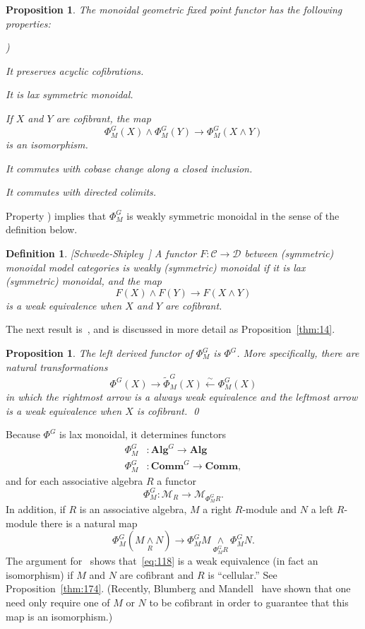 \documentclass{amsart}
\newtheorem{prop}[equation]{Proposition}
\newtheorem{definition}[equation]{Definition}
\newenvironment{defin}{\begin{definition}\rm}{\end{definition}}
\theoremstyle{definition}
\newtheorem{defin}[equation]{Definition}
\theoremstyle{remark}
\newcounter{thmItem}
\newcommand{\thmListItem}[1]{\rm \romannumeral#1)}
\newenvironment{thmList}{\begin{list}%
{\rm \roman{thmItem})}{\usecounter{thmItem}
\setlength{\labelwidth}{2em}
\setlength{\itemindent}{2em}
\setlength{\leftmargin}{0pt}
\setlength{\listparindent}{0pt}
\setlength{\parsep}{0pt}
\setlength{\partopsep}{0pt}
\setlength{\itemsep}{\medskipamount}
\setlength{\topsep}{\medskipamount}
}}{\end{list}}
\newcommand{\rmod}[1]{\mathcal M_{#1}}
\newcommand{\smashove}[1]{\underset{#1}{\wedge}}
\newcommand{\gfp}[1]{\Phi^{#1}}
\newcommand{\gfpm}[1]{\Phi_{M}^{#1}}
\newcommand{\phig}{\gfp{G}}
\newcommand{\phigm}{\gfpm{G}}
\newcommand{\einftycat}{\mathbf{Comm}}
\newcommand{\ainftycat}{\mathbf{Alg}}
\newcommand{\ugeinftycat}[1]{\einftycat^{#1}}
\newcommand{\ugainftycat}[1]{\ainftycat^{#1}}
\newcommand{\cat}[1]{{\mathcal #1}}
\begin{document}
\begin{prop}
\label{thm:203}
The monoidal geometric fixed point functor has the following
properties:
\begin{thmList}
\item It preserves acyclic cofibrations.
\item It is lax symmetric monoidal.
\item If $X$ and $Y$ are cofibrant, the map 
\[
\phigm(X)\wedge \phigm(Y)\to \phigm(X\wedge Y)
\]
is an isomorphism.
\item It commutes with cobase change along a closed inclusion.
\item It commutes with directed colimits.
\end{thmList}
\end{prop}

Property \thmListItem{3} implies that $\phigm$ is weakly symmetric monoidal in
the sense of the definition below.

\begin{defin}[Schwede-Shipley~\cite{MR1997322}]
\label{def:40} A functor $F:\cat C\to \cat D$ between (symmetric)
monoidal model categories is {\em weakly (symmetric) monoidal} if it
is lax (symmetric) monoidal, and the map
\[
F(X)\wedge F(Y)\to F(X\wedge Y)
\]
is a weak equivalence when $X$ and $Y$ are cofibrant.
\end{defin}

The next result is~\cite[Proposition V.4.17]{MR1922205}, and is
discussed in more detail as Proposition~\ref{thm:14}.

\begin{prop}
\label{thm:220} 
The left derived functor of $\phigm$ is $\phig$.  More
specifically, there are natural transformations
\[
\phig(X)\to \tilde{\Phi}^{G}_{M}(X)\xleftarrow{\sim} \phigm(X)
\]
in which the rightmost arrow is a always weak equivalence and the
leftmost arrow is a weak equivalence when $X$ is cofibrant.  \qed
\end{prop}

Because $\phig$ is lax monoidal, it determines functors
\begin{align*}
\phigm&:\ugainftycat{G}\to\ainftycat \\
\phigm&:\ugeinftycat{G}\to\einftycat,
\end{align*}
and for each associative algebra $R$ a functor 
\[
\phigm: \rmod{R}\to\rmod{\phigm R}.
\]
In addition, if $R$ is an associative algebra, $M$ a right $R$-module
and $N$ a left $R$-module there is a natural map
\begin{equation}
\label{eq:118}
\phigm(M\smashove{R}N) \to \phigm M\smashove{\phigm R} \phigm N.
\end{equation}
The argument for~\cite[Proposition V.4.7]{MR1922205} shows
that~\eqref{eq:118} is a weak equivalence (in fact an isomorphism) if
$M$ and $N$ are cofibrant and $R$ is ``cellular.'' See
Proposition~\ref{thm:174}.  (Recently, Blumberg and
Mandell~\cite[Appendix~A]{blumberg_cylcotomic} have shown that one
need only require one of $M$ or $N$ to be cofibrant in order to
guarantee that this map is an isomorphism.)
\end{document}
